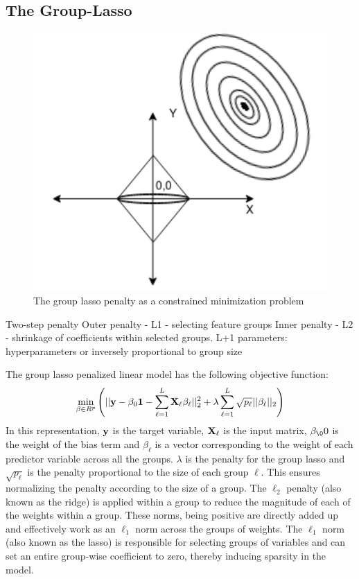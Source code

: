 \documentclass[a4paper,12pt]{article}
\def\bX {{\bf X}}
\def\by{{\bf y}}
\def\bone{{\bf 1}}
\begin{document}
\subsection{The Group-Lasso}

\begin{figure}[H]
    \centering
    \includegraphics[scale=0.4]{group-lasso.png}
    \caption{The group lasso penalty as a constrained minimization problem}
    \label{fig:ALAMO Flowchart}
\end{figure}
Two-step penalty
Outer penalty - L1 - selecting feature groups
Inner penalty - L2 - shrinkage of coefficients within selected groups.
L+1 parameters: hyperparameters or inversely proportional to group size


The group lasso \cite{yuan2006model} penalized linear model has the following objective function:
\begin{eqnarray}
\min_{\beta\in R^p}\left(||\by-\beta_0\bone-\sum_{\ell=1}^L
\bX_\ell\beta_\ell||_2^2 +\lambda \sum_{\ell=1}^L\sqrt{p_\ell} ||\beta_\ell||_2\right)
\label{LM.grlasdef}
\end{eqnarray}
In this representation, $\by$ is the target variable,  $\bX_\ell$ is the input matrix, $\beta_\00$  is the weight of the bias term and  $\beta_\ell$  is a vector corresponding to the weight of each predictor variable across all the groups. $\lambda$ is the penalty for the group lasso and $\sqrt{p_\ell}$ is the penalty proportional to the size of each group $\ell$. This ensures  normalizing the penalty according to the size of a group. The $\ell_2$ penalty (also known as the ridge) is applied within a group to reduce the magnitude of each of the weights within a group. These norms, being positive are directly added up and effectively work as an $ \ell_1$ norm across the groups of weights.  The $ \ell_1$  norm (also known as the lasso) is responsible for selecting groups of variables and can set an entire group-wise coefficient to zero, thereby inducing sparsity in the model. \\
\newpage
\end{document}
